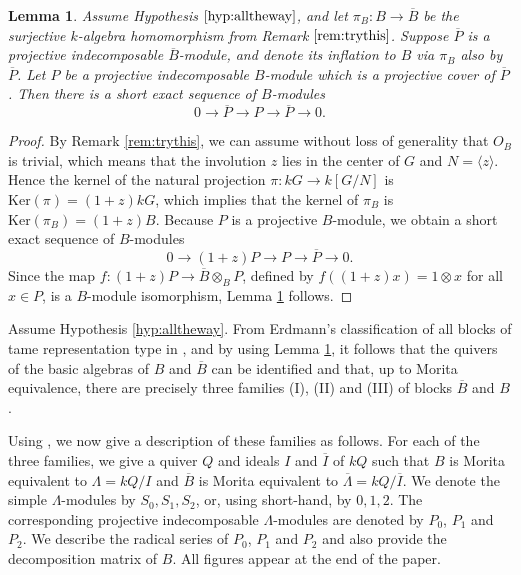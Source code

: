 \documentclass{amsart}
\theoremstyle{plain}
\newtheorem{lemma}[thm]{Lemma}
\theoremstyle{definition}
\theoremstyle{remark}
\begin{document}
\begin{lemma}
\label{lem:projectives}
Assume Hypothesis $\ref{hyp:alltheway}$, and
let $\pi_B:B\to\overline{B}$ be the surjective $k$-algebra homomorphism from Remark $\ref{rem:trythis}$. 
Suppose $\overline{P}$ is a projective indecomposable $\overline{B}$-module,
and denote its inflation to $B$ via $\pi_B$ also by $\overline{P}$. Let $P$ be a projective 
indecomposable $B$-module which is a projective cover of $\overline{P}$. Then 
there is a short exact sequence of $B$-modules
$$0\to \overline{P}\to P\to \overline{P}\to 0.$$
\end{lemma}

\begin{proof}
By Remark \ref{rem:trythis}, we can assume without loss
of generality that $O_B$ is trivial, which means that the involution $z$ lies in the center of $G$
and $N=\langle z \rangle$. Hence the kernel of the natural projection $\pi:kG\to k[G/N]$ 
is $\mathrm{Ker}(\pi)=(1+z)kG$, which implies that the kernel of $\pi_B$ is 
$\mathrm{Ker}(\pi_B)=(1+z)B$. Because $P$ is a projective $B$-module, we 
obtain a short exact sequence of $B$-modules
$$0\to (1+z)P \to P \to \overline{P}\to 0.$$
Since the map $f:(1+z)P\to \overline{B}\otimes_B P$, defined by $f((1+z)x)=1\otimes x$ for 
all $x\in P$, 
is a $B$-module isomorphism, Lemma \ref{lem:projectives} follows.
\end{proof}

Assume Hypothesis \ref{hyp:alltheway}.
From Erdmann's classification of all blocks of tame representation type 
in \cite{erd}, and by using Lemma \ref{lem:projectives}, it follows that the quivers of the basic algebras 
of $B$ and $\overline{B}$ can be identified and that, up to Morita equivalence, there
are precisely three families (I), (II) and (III) of blocks $\overline{B}$ and $B$.

Using \cite{erd}, we now give a  description of these families as follows.
For each of the three families, we give a quiver $Q$ and ideals $I$ and $\overline{I}$
of $kQ$ such that
$B$ is Morita equivalent to $\Lambda=kQ/I$ and $\overline{B}$ is Morita 
equivalent to $\overline{\Lambda}=kQ/\overline{I}$.
We denote the simple $\Lambda$-modules by $S_0,S_1,S_2$, or, using short-hand, by $0,1,2$.
The corresponding projective indecomposable $\Lambda$-modules are denoted by
$P_0$, $P_1$ and $P_2$. We describe the radical series of $P_0$, $P_1$ and $P_2$
and also provide the decomposition matrix of $B$. 
All figures appear at the end of the paper.
\end{document}
